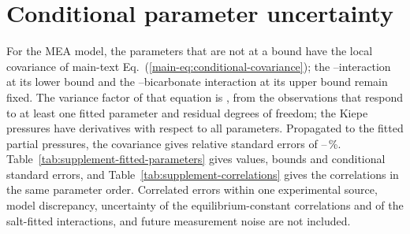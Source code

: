 \documentclass[a4paper,11pt]{article}
\begin{document}
\section{Conditional parameter uncertainty}\label{sec:s-uncertainty}
For the MEA model, the  parameters that are not at a bound have the local covariance of main-text Eq.~(\ref{main-eq:conditional-covariance}); the \MEAH--\MEACOO interaction at its lower bound and the \MEAH--bicarbonate interaction at its upper bound remain fixed.
The variance factor of that equation is , from the  observations that respond to at least one fitted parameter and  residual degrees of freedom; the  Kiepe pressures have  derivatives with respect to all  parameters.
Propagated to the  fitted \COtwo partial pressures, the covariance gives relative standard errors of --\,\%.
Table~\ref{tab:supplement-fitted-parameters} gives values, bounds and conditional standard errors, and Table~\ref{tab:supplement-correlations} gives the correlations in the same parameter order.
Correlated errors within one experimental source, model discrepancy, uncertainty of the equilibrium-constant correlations and of the salt-fitted interactions, and future measurement noise are not included.



\end{document}
